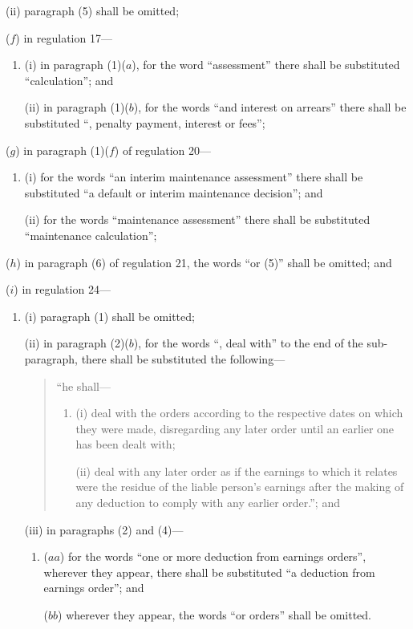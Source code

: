 \documentclass[12pt,a4paper]{article}
\begin{document}
\begin{enumerate}
\begin{enumerate}
(ii) paragraph (5) shall be omitted;
\end{enumerate}

($f$) in regulation 17—
\begin{enumerate}\item[]
(i) in paragraph (1)($a$), for the word “assessment” there shall be substituted “calculation”; and

(ii) in paragraph (1)($b$), for the words “and interest on arrears” there shall be substituted “, penalty payment, interest or fees”;
\end{enumerate}

($g$)  in paragraph (1)($f$)  of regulation 20—
\begin{enumerate}\item[]
(i) for the words “an interim maintenance assessment” there shall be substituted “a default or interim maintenance decision”; and

(ii) for the words “maintenance assessment” there shall be substituted “maintenance calculation”;
\end{enumerate}

($h$)  in paragraph (6) of regulation 21, the words “or (5)” shall be omitted; and

($i$) in regulation 24—
\begin{enumerate}\item[]
(i) paragraph (1) shall be omitted;

(ii) in paragraph (2)($b$), for the words “, deal with” to the end of the sub-paragraph, there shall be substituted the following—
\begin{quotation}
“he shall—
\begin{enumerate}\item[]
(i) deal with the orders according to the respective dates on which they were made, disregarding any later order until an earlier one has been dealt with;

(ii) deal with any later order as if the earnings to which it relates were the residue of the liable person’s earnings after the making of any deduction to comply with any earlier order.”; and
\end{enumerate}
\end{quotation}

(iii) in paragraphs (2) and (4)—
\begin{enumerate}\item[]
($aa$) for the words “one or more deduction from earnings orders”, wherever they appear, there shall be substituted “a deduction from earnings order”; and

($bb$) wherever they appear, the words “or orders” shall be omitted.
\end{enumerate}
\end{enumerate}
\end{enumerate}
\end{document}
